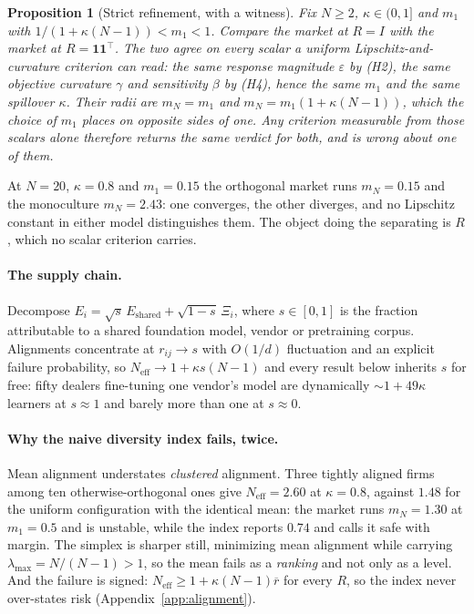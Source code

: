 \documentclass{article}
\theoremstyle{plain}
\newtheorem{proposition}[theorem]{Proposition}
\theoremstyle{definition}
\newcommand{\Neff}{N_{\mathrm{eff}}}
\newcommand{\mN}{m_N}
\newcommand{\lmax}{\lambda_{\max}}
\begin{document}
\begin{proposition}[Strict refinement, with a witness]
\label{prop:containment}
Fix $N \geq 2$, $\kappa \in (0,1]$ and $m_1$ with $1/(1+\kappa(N-1)) < m_1 < 1$. Compare the market at $R = I$ with the market at $R = \mathbf{1}\mathbf{1}^{\top}$. The two agree on every scalar a uniform Lipschitz-and-curvature criterion can read: the same response magnitude $\varepsilon$ by \textup{(H2)}, the same objective curvature $\gamma$ and sensitivity $\beta$ by \textup{(H4)}, hence the same $m_1$ and the same spillover $\kappa$. Their radii are $\mN = m_1$ and $\mN = m_1(1+\kappa(N-1))$, which the choice of $m_1$ places on opposite sides of one. Any criterion measurable from those scalars alone therefore returns the same verdict for both, and is wrong about one of them.
\end{proposition}

At $N=20$, $\kappa=0.8$ and $m_1 = 0.15$ the orthogonal market runs $\mN = 0.15$ and the monoculture $\mN = 2.43$: one converges, the other diverges, and no Lipschitz constant in either model distinguishes them. The object doing the separating is $R$, which no scalar criterion carries.

\paragraph{The supply chain.}
Decompose $E_i = \sqrt{s}\,E_{\text{shared}} + \sqrt{1-s}\,\Xi_i$, where $s\in[0,1]$ is the fraction attributable to a shared foundation model, vendor or pretraining corpus. Alignments concentrate at $r_{ij}\to s$ with $O(1/d)$ fluctuation and an explicit failure probability, so $\Neff \to 1 + \kappa s (N-1)$ and every result below inherits $s$ for free: fifty dealers fine-tuning one vendor's model are dynamically ${\sim}1+49\kappa$ learners at $s\approx 1$ and barely more than one at $s \approx 0$.

\paragraph{Why the naive diversity index fails, twice.}
Mean alignment understates \emph{clustered} alignment. Three tightly aligned firms among ten otherwise-orthogonal ones give $\Neff = 2.60$ at $\kappa = 0.8$, against $1.48$ for the uniform configuration with the identical mean: the market runs $\mN = 1.30$ at $m_1 = 0.5$ and is unstable, while the index reports $0.74$ and calls it safe with margin. The simplex is sharper still, minimizing mean alignment while carrying $\lmax = N/(N-1) > 1$, so the mean fails as a \emph{ranking} and not only as a level. And the failure is signed: $\Neff \geq 1 + \kappa(N-1)\overline{r}$ for every $R$, so the index never over-states risk (Appendix~\ref{app:alignment}).
\end{document}
